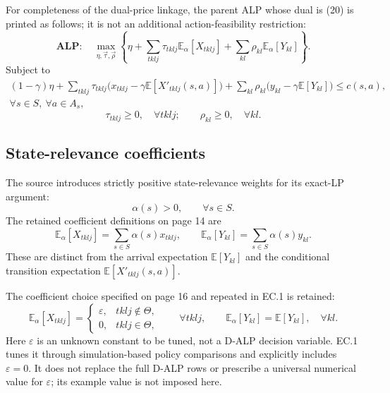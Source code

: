 \documentclass{article}
\begin{document}
For completeness of the dual-price linkage, the parent ALP whose dual is (20) is printed as follows; it is not an additional action-feasibility restriction:
\begin{equation}
\mathbf{ALP}:\quad
\max_{\eta,\vec\tau,\vec\rho}
\left\{\eta+\sum_{tklj}\tau_{tklj}\mathbb E_\alpha[X_{tklj}]
+\sum_{kl}\rho_{kl}\mathbb E_\alpha[Y_{kl}]\right\}.
\tag{18a}
\end{equation}
Subject to
\begin{equation}
\begin{split}
(1-\gamma)\eta
+\sum_{tklj}\tau_{tklj}\bigl(x_{tklj}-\gamma\mathbb E[X'_{tklj}(s,a)]\bigr)
+\sum_{kl}\rho_{kl}\bigl(y_{kl}-\gamma\mathbb E[Y_{kl}]\bigr)
\leq c(s,a),\\
\forall s\in S,\ \forall a\in A_s,
\end{split}
\tag{18b}
\end{equation}
\begin{equation}
\tau_{tklj}\geq0,\quad\forall tklj;\qquad
\rho_{kl}\geq0,\quad\forall kl.
\tag{18c}
\end{equation}

\subsection*{State-relevance coefficients}
The source introduces strictly positive state-relevance weights for its exact-LP argument:
\[
\alpha(s)>0,\qquad\forall s\in S.
\]
The retained coefficient definitions on page 14 are
\[
\mathbb E_\alpha[X_{tklj}]=\sum_{s\in S}\alpha(s)x_{tklj},\qquad
\mathbb E_\alpha[Y_{kl}]=\sum_{s\in S}\alpha(s)y_{kl}.
\]
These are distinct from the arrival expectation $\mathbb E[Y_{kl}]$ and the conditional transition expectation $\mathbb E[X'_{tklj}(s,a)]$.

The coefficient choice specified on page 16 and repeated in EC.1 is retained:
\[
\mathbb E_\alpha[X_{tklj}]=
\begin{cases}
\varepsilon,&tklj\notin\Theta,\\
0,&tklj\in\Theta,
\end{cases}
\qquad\forall tklj,
\qquad
\mathbb E_\alpha[Y_{kl}]=\mathbb E[Y_{kl}],\quad\forall kl.
\]
Here $\varepsilon$ is an unknown constant to be tuned, not a D-ALP decision variable. EC.1 tunes it through simulation-based policy comparisons and explicitly includes $\varepsilon=0$. It does not replace the full D-ALP rows or prescribe a universal numerical value for $\varepsilon$; its example value is not imposed here.
\end{document}
